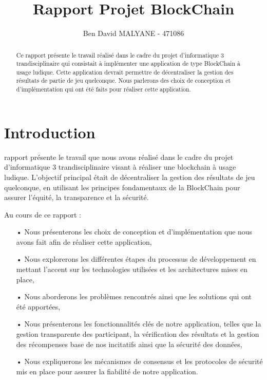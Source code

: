 \documentclass[journal, a4paper]{IEEEtran}
\begin{document}
	\title{Rapport Projet BlockChain}
	\author{Ben David MALYANE - 471086}
	\maketitle

\begin{abstract}
	Ce rapport présente le travail réalisé dans le cadre du projet d'informatique 3 trandisciplinaire qui consistait
	à implémenter une application de type BlockChain à usage ludique.
	Cette application devrait permettre de décentraliser la gestion des résultats de partie de jeu quelconque.
	Nous parlerons des choix de conception et d'implémentation qui ont été faits pour réaliser cette application.
\end{abstract}

\section{Introduction}\label{sec:introduction}
	 rapport présente le travail que nous avons réalisé dans le cadre du projet d'informatique 3 trandisciplinaire visant à réaliser une blockchain à usage ludique.
	L'objectif principal était de décentraliser la gestion des résultats de jeu quelconque, en  utilisant  les principes fondamentaux de la BlockChain pour assurer l'équité,
	la transparence et la sécurité.

	Au cours de ce rapport :
	\begin{itemize}
		\item[•] Nous présenterons les choix de conception et d'implémentation que nous avons fait afin de réaliser cette application,
		\item[•] Nous explorerons les différentes étapes du processus de développement en mettant l'accent sur les technologies utilisées
	et les architectures mises en place,
		\item[•] Nous aborderons les problèmes rencontrés ainsi que les solutions qui ont été apportées,
		\item[•] Nous présenterons les fonctionnalités clés de notre application, telles que la gestion transparente
		des participant, la vérification des résultats et la gestion des récompenses base de nos incitatifs ainsi que la sécurité des données,
		\item[•] Nous expliquerons les mécanismes de consensus et les protocoles de sécurité mis en place pour assurer la fiabilité de notre application.
	\end{itemize}
\end{document}
